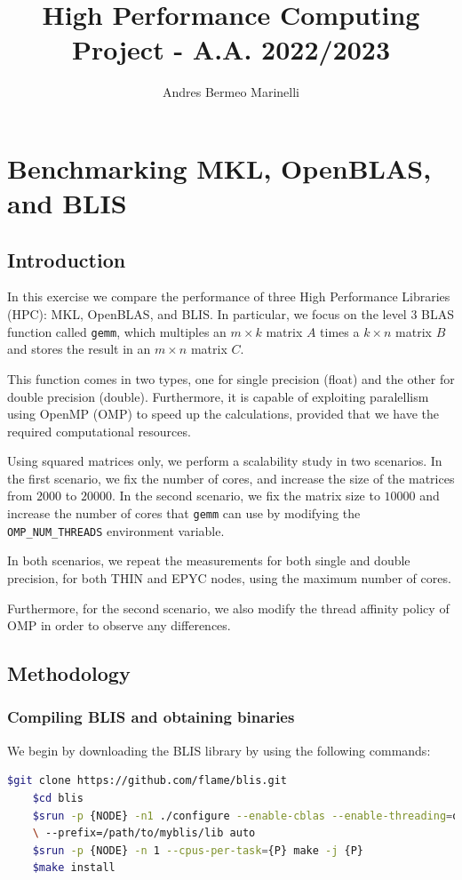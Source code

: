 \documentclass{report}
\title{High Performance Computing Project - A.A. 2022/2023}
\author{Andres Bermeo Marinelli}
\begin{document}
\maketitle
\tableofcontents
\chapter{Benchmarking MKL, OpenBLAS, and BLIS}

\section{Introduction}

In this exercise we compare the performance of three High Performance Libraries
(HPC): MKL, OpenBLAS, and BLIS. In particular, we focus on the level 3 BLAS 
function called \texttt{gemm}, which multiples an $m \times k$ matrix $A$ times 
a $k \times n$ matrix $B$ and stores the result in an $m \times n$ matrix $C$. 

This function comes in two types, one for single 
precision (float) and the other for double precision (double). Furthermore, it 
is capable of exploiting paralellism using OpenMP (OMP) to speed up the 
calculations, provided that we have the required computational resources.

Using squared matrices only, we perform a scalability study in two scenarios. 
In the first scenario, we fix the number of cores, and increase the size of the
matrices from $2000$ to $20000$. In the second scenario, we fix the matrix size 
to $10000$ and increase the number of cores that \texttt{gemm} can use by 
modifying the \texttt{OMP\_NUM\_THREADS} environment variable.

In both scenarios, we repeat the measurements for both single and double
precision, for both THIN and EPYC nodes, using the maximum number of cores.

Furthermore, for the second scenario, we also modify the thread affinity policy 
of OMP in order to observe any differences.

\section{Methodology}

\subsection{Compiling BLIS and obtaining binaries}

We begin by downloading the BLIS library by using the following commands:
\begin{lstlisting}[language=bash]
    $git clone https://github.com/flame/blis.git
    $cd blis
    $srun -p {NODE} -n1 ./configure --enable-cblas --enable-threading=openmp \
    \ --prefix=/path/to/myblis/lib auto
    $srun -p {NODE} -n 1 --cpus-per-task={P} make -j {P}
    $make install
\end{lstlisting}
\end{document}
